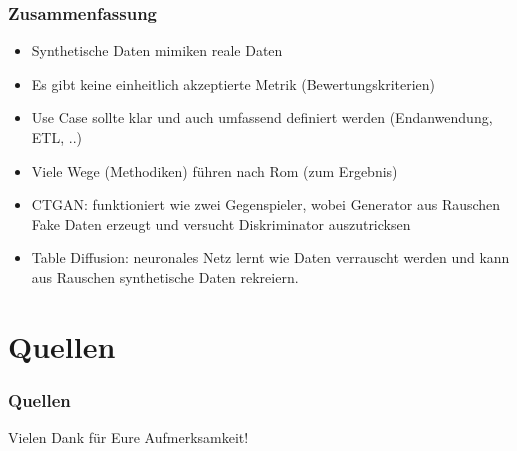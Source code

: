 \documentclass[
	11pt, %
]{beamer}
\begin{document}
\begin{frame}
    \frametitle{Zusammenfassung}
    \begin{itemize}
        \item Synthetische Daten mimiken reale Daten
        \item Es gibt keine einheitlich akzeptierte Metrik (Bewertungskriterien)
        \item Use Case sollte klar und auch umfassend definiert werden (Endanwendung, ETL, ..)
        \item Viele Wege (Methodiken) führen nach Rom (zum Ergebnis)
        \item CTGAN: funktioniert wie zwei Gegenspieler, wobei Generator aus Rauschen Fake Daten erzeugt und versucht Diskriminator auszutricksen
        \item Table Diffusion: neuronales Netz lernt wie Daten verrauscht werden und kann aus Rauschen synthetische Daten rekreiern.
    \end{itemize}
\end{frame}


\section{Quellen}

\begin{frame}
    \frametitle{Quellen}   
    \renewcommand{\bibfont}{\tiny} %
    \printbibliography
\end{frame}


\begin{frame}
    \begin{center}
        {\Huge Vielen Dank für Eure Aufmerksamkeit!}
    \end{center}
\end{frame}

\end{document}

